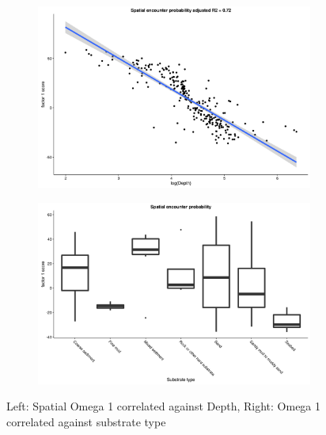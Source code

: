 \documentclass{article}
\newcommand{\beginsupplement}{%
		        \setcounter{table}{0}
		        \renewcommand{\thetable}{S\arabic{table}}%
		        \setcounter{figure}{0}
		        \renewcommand{\thefigure}{S\arabic{figure}}%
			     }
\begin{document}
\beginsupplement



\begin{figure}[!ht]
	\label{fig:S1}
	\begin{subfigure}{0.5\textwidth}
	\includegraphics[width = \linewidth]{"figures/Factor1_DepthO1"}
\end{subfigure}
\begin{subfigure}{0.5\textwidth}
	\includegraphics[width = \linewidth]{"figures/Factor1_HabitatO1"}
\end{subfigure}
\caption{Left: Spatial Omega 1 correlated against Depth, Right: Omega 1
	correlated against substrate type}

\end{figure}

\end{document}
